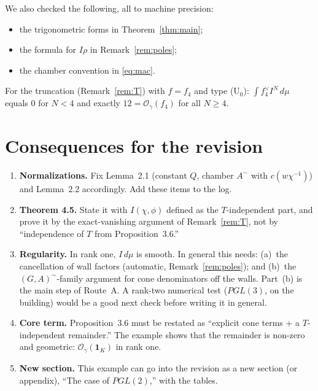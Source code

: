 \documentclass[11pt]{article}
\theoremstyle{remark}
\newcommand{\OO}{\mathcal{O}}
\begin{document}
We also checked the following, all to machine precision:
\begin{itemize}
\item the trigonometric forms in Theorem~\ref{thm:main};
\item the formula for $I\rho$ in Remark~\ref{rem:poles};
\item the chamber convention in \eqref{eq:mac}.
\end{itemize}
For the truncation (Remark~\ref{rem:T}) with $f=f_4$ and type (U$_0$): $\int f_4^\vee I^N\,d\mu$ equals $0$ for $N<4$ and exactly $12=\OO_\gamma(f_4)$ for all $N\ge4$.

\section{Consequences for the revision}
\begin{enumerate}
\item \textbf{Normalizations.} Fix Lemma~2.1 (constant $Q$, chamber $A^-$ with $c(w\chi^{-1})$) and Lemma~2.2 accordingly. Add these items to the log.
\item \textbf{Theorem 4.5.} State it with $I(\chi,\phi)$ defined as the $T$-independent part, and prove it by the exact-vanishing argument of Remark~\ref{rem:T}, not by ``independence of $T$ from Proposition~3.6.''
\item \textbf{Regularity.} In rank one, $I\,d\mu$ is smooth. In general this needs: (a)~the cancellation of wall factors (automatic, Remark~\ref{rem:poles}); and (b)~the $(G,A)^\sim$-family argument for cone denominators off the walls. Part~(b) is the main step of Route~A. A rank-two numerical test ($PGL(3)$, on the building) would be a good next check before writing it in general.
\item \textbf{Core term.} Proposition~3.6 must be restated as ``explicit cone terms $+$ a $T$-independent remainder.'' The example shows that the remainder is non-zero and geometric: $\OO_\gamma(\mathbf 1_K)$ in rank one.
\item \textbf{New section.} This example can go into the revision as a new section (or appendix), ``The case of $PGL(2)$,'' with the tables.
\end{enumerate}
\end{document}
